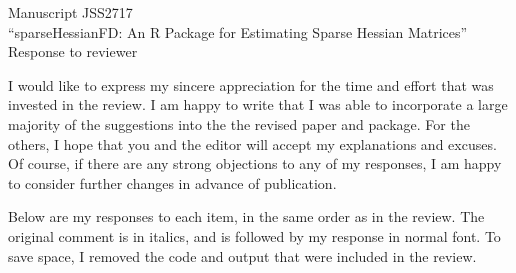\documentclass{article}
\begin{document}
{\bfseries
\begin{center}
  Manuscript JSS2717\\
 ``sparseHessianFD: An R Package for Estimating Sparse
 Hessian Matrices''\\
 \vspace{\baselineskip}
 Response to reviewer
\end{center}
}
\vspace{\baselineskip}

I would like to express my sincere appreciation for the time and effort that
was invested in the review.  I am happy to write that I was
able to incorporate a large majority of the suggestions into the the
revised paper and package. For the
others, I hope that you and the editor will accept my
explanations and excuses.  Of course, if there are any strong
objections to any of my responses, I am happy
to consider further changes in advance of publication.

Below are my responses to each item, in the same order as in the
review.  The original comment is in italics, and is followed by my
response in normal font.  To save space, I removed the code and output
that were included in the review.

\vspace{\baselineskip}
\end{document}
